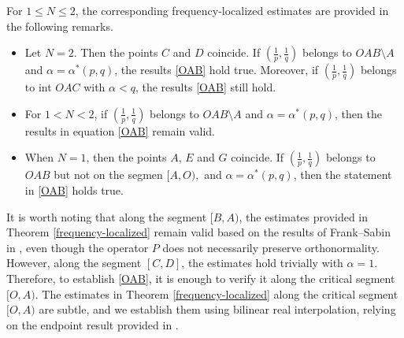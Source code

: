 \documentclass[a4paper,11pt, reqno]{amsart}
\numberwithin{equation}{section}
\theoremstyle{plain}
\theoremstyle{definition}
\theoremstyle{remark}
\newtheorem{remark}[theorem]{Remark}
\begin{document}
For $1\leq N\leq 2$, the corresponding frequency-localized estimates are provided in the following remarks.
\begin{itemize}
    \item \label{N=2} Let $N=2$.  Then the points $C$ and $D$ coincide. If $(\frac{1}{p},\frac{1}{q})$ belongs to $ OAB\setminus A$  and $\alpha=\alpha^*(p,q)$, the results \eqref{OAB} hold true. Moreover,  if $(\frac{1}{p},\frac{1}{q})$ belongs to int $OAC$ with $\alpha<q$, the results \eqref{OAB} still hold.
    \item \label{1<N<2} For $1<N<2$, if $(\frac{1}{p},\frac{1}{q})$ belongs to $ OAB\setminus A$  and $\alpha=\alpha^*(p,q)$, then the results in equation \eqref{OAB} remain valid.
    \item \label{N=1} When  $N=1$, then the points $A$, $E$ and $G$ coincide. If  $(\frac{1}{p},\frac{1}{q})$ belongs to $ OAB$ but not on the segmen $[A,O),$  and $\alpha=\alpha^*(p,q)$, then the statement in \eqref{OAB} holds true.
\end{itemize}

It is worth noting that along the segment 
$[B, A)$,  the estimates provided in Theorem \ref{frequency-localized} remain valid based on the results of Frank–Sabin in \cite{FS}, even though the operator 
$P$ does not necessarily preserve orthonormality. However, along the segment 
$[C, D]$,  the estimates hold trivially with $\alpha=1$.  Therefore, to establish \eqref{OAB}, it is enough to verify it along the critical segment 
 $[O, A).$ The estimates in Theorem \ref{frequency-localized} along the critical segment $[O, A)$ are subtle, and we establish them using bilinear real interpolation, relying on the endpoint result provided in \cite{KT}.
\end{document}
